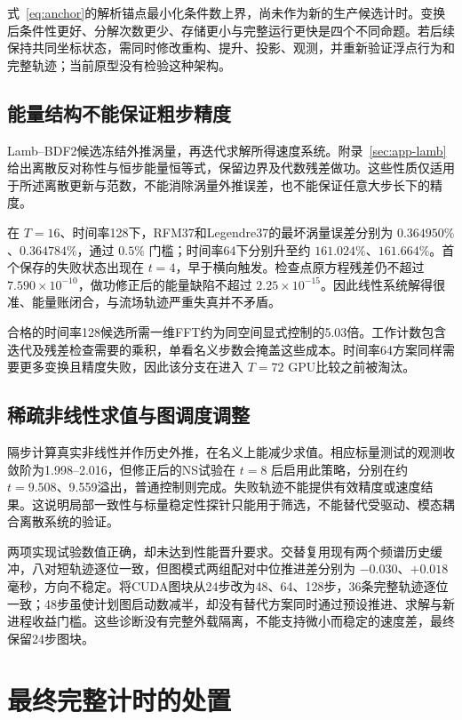 式~\eqref{eq:anchor}的解析锚点最小化条件数上界，尚未作为新的生产候选计时。变换后条件性更好、分解次数更少、存储更小与完整运行更快是四个不同命题。若后续保持共同坐标状态，需同时修改重构、提升、投影、观测，并重新验证浮点行为和完整轨迹；当前原型没有检验这种架构。

\subsection{能量结构不能保证粗步精度}

Lamb--BDF2候选冻结外推涡量，再迭代求解所得速度系统。附录~\ref{sec:app-lamb}给出离散反对称性与恒步能量恒等式，保留边界及代数残差做功。这些性质仅适用于所述离散更新与范数，不能消除涡量外推误差，也不能保证任意大步长下的精度。

在 $T=16$、时间率128下，RFM37和Legendre37的最坏涡量误差分别为 $0.364950\%$、$0.364784\%$，通过 $0.5\%$ 门槛；时间率64下分别升至约 $161.024\%$、$161.664\%$。首个保存的失败状态出现在 $t=4$，早于横向触发。检查点原方程残差仍不超过 $7.590\times10^{-10}$，做功修正后的能量缺陷不超过 $2.25\times10^{-15}$。因此线性系统解得很准、能量账闭合，与流场轨迹严重失真并不矛盾。

合格的时间率128候选所需一维FFT约为同空间显式控制的5.03倍。工作计数包含迭代及残差检查需要的乘积，单看名义步数会掩盖这些成本。时间率64方案同样需要更多变换且精度失败，因此该分支在进入 $T=72$ GPU比较之前被淘汰。

\subsection{稀疏非线性求值与图调度调整}

隔步计算真实非线性并作历史外推，在名义上能减少求值。相应标量测试的观测收敛阶为1.998--2.016，但修正后的NS试验在 $t=8$ 后启用此策略，分别在约 $t=9.508$、9.559溢出，普通控制则完成。失败轨迹不能提供有效精度或速度结果。这说明局部一致性与标量稳定性探针只能用于筛选，不能替代受驱动、模态耦合离散系统的验证。

两项实现试验数值正确，却未达到性能晋升要求。交替复用现有两个频谱历史缓冲，八对短轨迹逐位一致，但图模式两组配对中位推进差分别为 $-0.030$、$+0.018$ 毫秒，方向不稳定。将CUDA图块从24步改为48、64、128步，36条完整轨迹逐位一致；48步虽使计划图启动数减半，却没有替代方案同时通过预设推进、求解与新进程收益门槛。这些诊断没有完整外载隔离，不能支持微小而稳定的速度差，最终保留24步图块。

\section{最终完整计时的处置}
\label{sec:timing-disposition}

